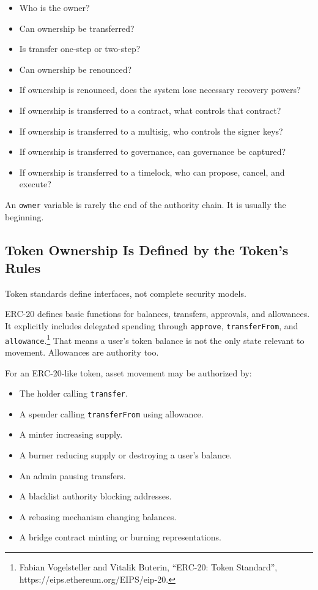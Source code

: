 \begin{itemize}
\tightlist
\item
  Who is the owner?
\item
  Can ownership be transferred?
\item
  Is transfer one-step or two-step?
\item
  Can ownership be renounced?
\item
  If ownership is renounced, does the system lose necessary recovery
  powers?
\item
  If ownership is transferred to a contract, what controls that
  contract?
\item
  If ownership is transferred to a multisig, who controls the signer
  keys?
\item
  If ownership is transferred to governance, can governance be captured?
\item
  If ownership is transferred to a timelock, who can propose, cancel,
  and execute?
\end{itemize}

An \passthrough{\lstinline!owner!} variable is rarely the end of the
authority chain. It is usually the beginning.

\subsection{Token Ownership Is Defined by the Token's Rules}

Token standards define interfaces, not complete security models.

ERC-20 defines basic functions for balances, transfers, approvals, and
allowances. It explicitly includes delegated spending through
\passthrough{\lstinline!approve!},
\passthrough{\lstinline!transferFrom!}, and
\passthrough{\lstinline!allowance!}.\footnote{Fabian Vogelsteller and
  Vitalik Buterin, ``ERC-20: Token Standard'',
  https://eips.ethereum.org/EIPS/eip-20.} That means a user's token
balance is not the only state relevant to movement. Allowances are
authority too.

For an ERC-20-like token, asset movement may be authorized by:

\begin{itemize}
\tightlist
\item
  The holder calling \passthrough{\lstinline!transfer!}.
\item
  A spender calling \passthrough{\lstinline!transferFrom!} using
  allowance.
\item
  A minter increasing supply.
\item
  A burner reducing supply or destroying a user's balance.
\item
  An admin pausing transfers.
\item
  A blacklist authority blocking addresses.
\item
  A rebasing mechanism changing balances.
\item
  A bridge contract minting or burning representations.
\end{itemize}

